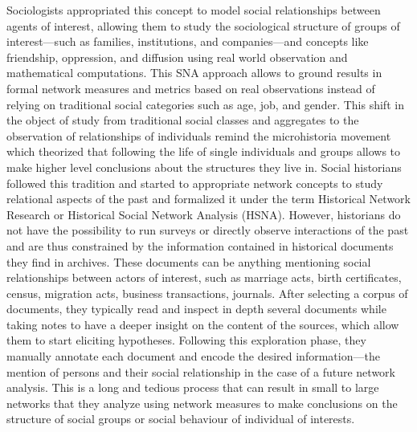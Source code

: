 Sociologists appropriated this concept to model social relationships between agents of interest, allowing them to study the sociological structure of groups of interest---such as families, institutions, and companies---and concepts like friendship, oppression, and diffusion using real world observation and mathematical computations.
This SNA approach allows to ground results in formal network measures and metrics based on real observations instead of relying on traditional social categories such as age, job, and gender\cite{freemanDevelopmentSocialNetwork2004}.
This shift in the object of study from traditional social classes and aggregates to the observation of relationships of individuals remind the microhistoria movement \cite{ginzburgMicrohistoire1981} which theorized that following the life of single individuals and groups allows to make higher level conclusions about the structures they live in.
Social historians followed this tradition and started to appropriate network concepts to study relational aspects of the past and formalized it under the term Historical Network Research or Historical Social Network Analysis (HSNA)\cite{wetherellHistoricalSocialNetwork1998}.
However, historians do not have the possibility to run surveys or directly observe interactions of the past and are thus constrained by the information contained in historical documents they find in archives.
These documents can be anything mentioning social relationships between actors of interest, such as marriage acts, birth certificates, census, migration acts, business transactions, journals.
After selecting a corpus of documents, they typically read and inspect in depth several documents while taking notes to have a deeper insight on the content of the sources, which allow them to start eliciting hypotheses.
Following this exploration phase, they manually annotate each document and encode the desired information---the mention of persons and their social relationship in the case of a future network analysis.
This is a long and tedious process that can result in small to large networks that they analyze using network measures to make conclusions on the structure of social groups or social behaviour of individual of interests.

